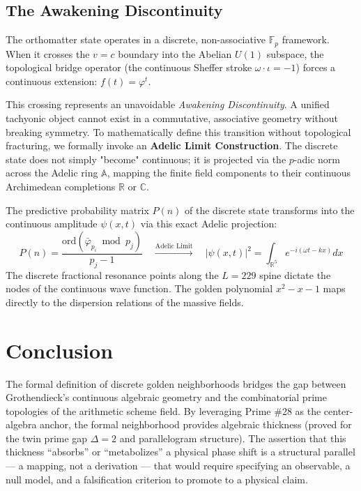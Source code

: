\subsection{The Awakening Discontinuity}

The orthomatter state operates in a discrete, non-associative $\mathbb{F}_p$ framework. When it crosses the $v=c$ boundary into the Abelian $U(1)$ subspace, the topological bridge operator (the continuous Sheffer stroke $\omega \cdot \iota = -1$) forces a continuous extension: $f(t) = \varphi^t$.

This crossing represents an unavoidable \textit{Awakening Discontinuity}. A unified tachyonic object cannot exist in a commutative, associative geometry without breaking symmetry. To mathematically define this transition without topological fracturing, we formally invoke an \textbf{Adelic Limit Construction}. The discrete state does not simply "become" continuous; it is projected via the $p$-adic norm across the Adelic ring $\mathbb{A}$, mapping the finite field components to their continuous Archimedean completions $\mathbb{R}$ or $\mathbb{C}$.

The predictive probability matrix $P(n)$ of the discrete state transforms into the continuous amplitude $\psi(x,t)$ via this exact Adelic projection:
\begin{equation}
    P(n) = \frac{\mathrm{ord}(\bar\varphi_{p_i} \bmod p_j)}{p_j - 1} \quad \xrightarrow{\text{Adelic Limit}} \quad |\psi(x,t)|^2 = \int_{\mathbb{R}^5} e^{-i(\omega t - k x)} dx
\end{equation}
The discrete fractional resonance points along the $L=229$ spine dictate the nodes of the continuous wave function. The golden polynomial $x^2 - x - 1$ maps directly to the dispersion relations of the massive fields.

\section{Conclusion}
The formal definition of discrete golden neighborhoods bridges the gap between Grothendieck's continuous algebraic geometry and the combinatorial prime topologies of the arithmetic scheme field. By leveraging Prime \#28 as the center-algebra anchor, the formal neighborhood provides algebraic thickness (proved for the twin prime gap $\Delta=2$ and parallelogram structure). The assertion that this thickness ``absorbs'' or ``metabolizes'' a physical phase shift is a structural parallel --- a mapping, not a derivation --- that would require specifying an observable, a null model, and a falsification criterion to promote to a physical claim.

